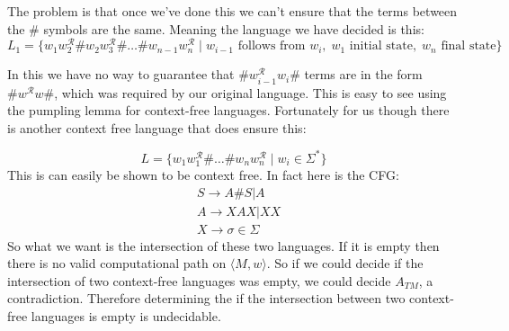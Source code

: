 \documentclass[english]{article}
\begin{document}
The problem is that once we've done this we can't ensure that the terms between
the $\#$ symbols are the same. Meaning the language we have decided is this:
\begin{equation*}
L_1 = \{ w_1 w_2^\mathcal{R} \# w_2 w_3^\mathcal{R} \# \ldots
			\# w_{n-1} w_n^\mathcal{R} \mid
		w_{i-1} \textrm{ follows from } w_i,\; w_1 \textrm{ initial state}, \;
		w_n \textrm{ final state} \}
\end{equation*}

In this we have no way to guarantee that $\# w_{i-1}^\mathcal{R} w_i \#$
terms are in the form $\# w^\mathcal{R} w \#$, which was required by our
original language. This is easy to see using the pumpling lemma for
context-free languages. Fortunately for us though there is another context free
language that does ensure this:

\begin{equation*}
L = \{ w_1 w_1^\mathcal{R} \#  \ldots \# w_n w_n^\mathcal{R} \mid
        w_i \in \Sigma^* \}
\end{equation*}
This is can easily be shown to be context free. In fact here is the CFG:
\begin{align*}
& S \rightarrow A\#S | A \\
& A \rightarrow X A X | XX \\
& X \rightarrow \sigma \in \Sigma
\end{align*}
So what we want is the intersection of these two languages. If it is empty then
there is no valid computational path on $\langle M,w \rangle$. So if we could
decide if the intersection of two context-free languages was empty, we could
decide $A_{TM}$, a contradiction. Therefore determining the if the intersection
between two context-free languages is empty is undecidable.
\end{document}
